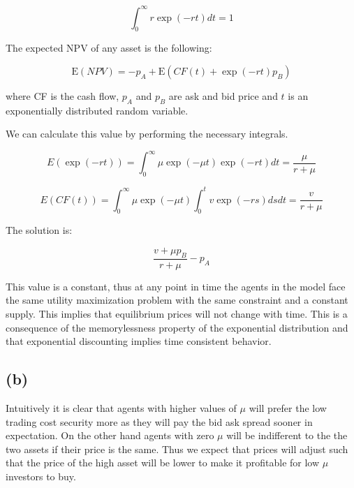 \documentclass{article}
\begin{document}
\begin{equation}
\int_0^\infty r \exp(-rt) dt = 1
\end{equation}

The expected NPV of any asset is the following:

\begin{equation}
\mathrm{E}(NPV) = -p_A + \mathrm{E}(CF(t) + \exp(-rt)p_B)
\end{equation}

where CF is the cash flow, $p_A$ and $p_B$ are ask and bid price and $t$ is an exponentially distributed random variable.

We can calculate this value by performing the necessary integrals.

\begin{equation}
E(\exp(-rt))=\int_0^\infty \mu \exp(-\mu t)\exp(-rt) dt =\frac{\mu}{r+\mu}
\end{equation}

\begin{equation}
E(CF(t))= \int_0^\infty \mu \exp(-\mu t) \int_0^t v \exp(-rs) ds dt = \frac{v}{r+\mu}
\end{equation}

The solution is:

\begin{equation}
\frac{v+\mu p_B}{r+\mu}-p_A
\end{equation}

This value is a constant, thus at any point in time the agents in the model face the same utility maximization problem with the same constraint and a constant supply. This implies that equilibrium prices will not change with time. This is a consequence of the memorylessness property of the exponential distribution and that exponential discounting implies time consistent behavior.

\subsection{(b)}

Intuitively it is clear that agents with higher values of $\mu$ will prefer the low trading cost security more as they will pay the bid ask spread sooner in expectation. On the other hand agents with zero $\mu$ will be indifferent to the the two assets if their price is the same. Thus we expect that prices will adjust such that the price of the high asset will be lower to make it profitable for low $\mu$ investors to buy.
\end{document}
